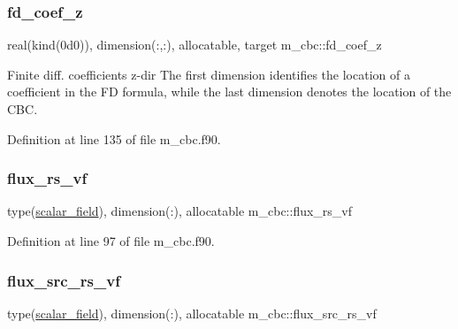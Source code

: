 \mbox{\label{namespacem__cbc_a025a2f672d7d9997966bdedab3f333de}} 
\subsubsection{\texorpdfstring{fd\+\_\+coef\+\_\+z}{fd\_coef\_z}}
{\footnotesize\ttfamily real(kind(0d0)), dimension(\+:,\+:), allocatable, target m\+\_\+cbc\+::fd\+\_\+coef\+\_\+z}



Finite diff. coefficients z-\/dir The first dimension identifies the location of a coefficient in the FD formula, while the last dimension denotes the location of the C\+BC. 



Definition at line 135 of file m\+\_\+cbc.\+f90.

\mbox{\label{namespacem__cbc_abbb35cbd4d0951e9231865bd4120e682}} 
\subsubsection{\texorpdfstring{flux\+\_\+rs\+\_\+vf}{flux\_rs\_vf}}
{\footnotesize\ttfamily type(\hyperlink{structm__derived__types_1_1scalar__field}{scalar\+\_\+field}), dimension(\+:), allocatable m\+\_\+cbc\+::flux\+\_\+rs\+\_\+vf}



Definition at line 97 of file m\+\_\+cbc.\+f90.

\mbox{\label{namespacem__cbc_a5075a07fe184dfe7d109f6b4e14f7302}} 
\subsubsection{\texorpdfstring{flux\+\_\+src\+\_\+rs\+\_\+vf}{flux\_src\_rs\_vf}}
{\footnotesize\ttfamily type(\hyperlink{structm__derived__types_1_1scalar__field}{scalar\+\_\+field}), dimension(\+:), allocatable m\+\_\+cbc\+::flux\+\_\+src\+\_\+rs\+\_\+vf}



